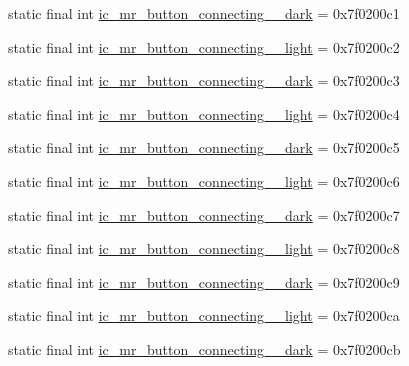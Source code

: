\begin{CompactItemize}
\item 
static final int \hyperlink{classandroid_1_1support_1_1graphics_1_1drawable_1_1animated_1_1_r_1_1drawable_33785e2ecfc8262a65fc49f4db6e863b}{ic\_\-mr\_\-button\_\-connecting\_\_\-dark} = 0x7f0200c1
\item 
static final int \hyperlink{classandroid_1_1support_1_1graphics_1_1drawable_1_1animated_1_1_r_1_1drawable_83e2b09e51f29fc6b3de4583642e8e0c}{ic\_\-mr\_\-button\_\-connecting\_\_\-light} = 0x7f0200c2
\item 
static final int \hyperlink{classandroid_1_1support_1_1graphics_1_1drawable_1_1animated_1_1_r_1_1drawable_006cb9663f9d686f2b797ae4b465cd6a}{ic\_\-mr\_\-button\_\-connecting\_\_\-dark} = 0x7f0200c3
\item 
static final int \hyperlink{classandroid_1_1support_1_1graphics_1_1drawable_1_1animated_1_1_r_1_1drawable_dc1d2dc5e3bfa51e755443f16166b575}{ic\_\-mr\_\-button\_\-connecting\_\_\-light} = 0x7f0200c4
\item 
static final int \hyperlink{classandroid_1_1support_1_1graphics_1_1drawable_1_1animated_1_1_r_1_1drawable_4d7e583d58740f1745eab2af481d4dd4}{ic\_\-mr\_\-button\_\-connecting\_\_\-dark} = 0x7f0200c5
\item 
static final int \hyperlink{classandroid_1_1support_1_1graphics_1_1drawable_1_1animated_1_1_r_1_1drawable_dbfd95d492d786949e8280c4b3ea55f0}{ic\_\-mr\_\-button\_\-connecting\_\_\-light} = 0x7f0200c6
\item 
static final int \hyperlink{classandroid_1_1support_1_1graphics_1_1drawable_1_1animated_1_1_r_1_1drawable_a49de9fa0a970188e2400317f31ef856}{ic\_\-mr\_\-button\_\-connecting\_\_\-dark} = 0x7f0200c7
\item 
static final int \hyperlink{classandroid_1_1support_1_1graphics_1_1drawable_1_1animated_1_1_r_1_1drawable_7a987913b9fde18fe06d049a19c50c7d}{ic\_\-mr\_\-button\_\-connecting\_\_\-light} = 0x7f0200c8
\item 
static final int \hyperlink{classandroid_1_1support_1_1graphics_1_1drawable_1_1animated_1_1_r_1_1drawable_ae91bb30850bbd760a22dcf3baab2d4d}{ic\_\-mr\_\-button\_\-connecting\_\_\-dark} = 0x7f0200c9
\item 
static final int \hyperlink{classandroid_1_1support_1_1graphics_1_1drawable_1_1animated_1_1_r_1_1drawable_b9956c1a261b122f2e41f9c91ec6deaf}{ic\_\-mr\_\-button\_\-connecting\_\_\-light} = 0x7f0200ca
\item 
static final int \hyperlink{classandroid_1_1support_1_1graphics_1_1drawable_1_1animated_1_1_r_1_1drawable_be64db48358001e3f3b88ad21f6f0fd4}{ic\_\-mr\_\-button\_\-connecting\_\_\-dark} = 0x7f0200cb

\end{CompactItemize}
